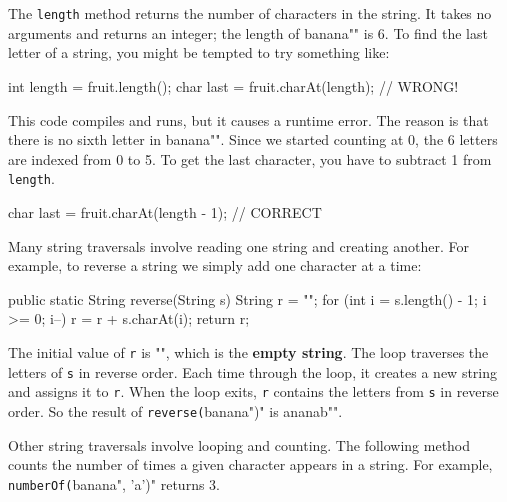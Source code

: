 \documentclass[12pt]{book}
\makeatletter
\theoremstyle{exercise}
\newcommand{\java}[1]{\verb"#1"}
\renewcommand{\section}{\@startsection {section}{1}{\z@}%
    {-3.5ex \@plus -1ex \@minus -.2ex}%
    {0.7ex \@plus.2ex}%
    {\normalfont\Large\bfseries}}
\newcommand{\java}[1]{\lstinline{#1}} %
\makeatother
\begin{document}

The \java{length} method returns the number of characters in the string.
It takes no arguments and returns an integer; the length of \java{"banana"} is 6.
To find the last letter of a string, you might be tempted to try something like:

\begin{code}
    int length = fruit.length();
    char last = fruit.charAt(length);      // WRONG!
\end{code}

This code compiles and runs, but it causes a runtime error.
The reason is that there is no sixth letter in \java{"banana"}.
Since we started counting at 0, the 6 letters are indexed from 0 to 5.
To get the last character, you have to subtract 1 from \java{length}.

\begin{code}
    char last = fruit.charAt(length - 1);  // CORRECT
\end{code}

Many string traversals involve reading one string and creating another.
For example, to reverse a string we simply add one character at a time:

\begin{code}
    public static String reverse(String s) {
        String r = "";
        for (int i = s.length() - 1; i >= 0; i--) {
            r = r + s.charAt(i);
        }
        return r;
    }
\end{code}


The initial value of \java{r} is \java{""}, which is the {\bf empty string}.
The loop traverses the letters of \java{s} in reverse order.
Each time through the loop, it creates a new string and assigns it to \java{r}.
When the loop exits, \java{r} contains the letters from \java{s} in reverse order.
So the result of \java{reverse("banana")} is \java{"ananab"}.

\label{loopcount}


Other string traversals involve looping and counting.
The following method counts the number of times a given character appears in a string.
For example, \java{numberOf("banana", 'a')} returns 3.
\end{document}
